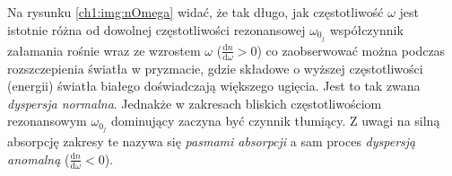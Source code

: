 Na rysunku \ref{ch1:img:nOmega} widać, że tak długo, jak częstotliwość $\omega$ jest istotnie różna od dowolnej częstotliwości rezonansowej $\omega_{0_j}$ współczynnik załamania rośnie wraz ze wzrostem $\omega$ ($\frac{\mathrm{d}n}{\mathrm{d}\omega} > 0$) co zaobserwować można podczas rozszczepienia światła w pryzmacie, gdzie składowe o wyższej częstotliwości (energii) światła białego doświadczają większego ugięcia. Jest to tak zwana \textit{dyspersja normalna}. Jednakże w zakresach bliskich częstotliwościom rezonansowym $\omega_{0_j}$ dominujący zaczyna być czynnik tłumiący. Z uwagi na silną absorpcję zakresy te nazywa się \textit{pasmami absorpcji} a sam proces \textit{dyspersją anomalną} ($\frac{\mathrm{d}n}{\mathrm{d}\omega} < 0$).

